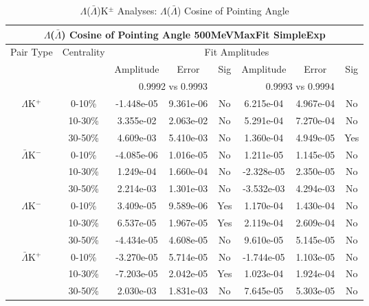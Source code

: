 \documentclass[../AnalysisNoteJBuxton.tex]{subfiles}
\begin{document}
\begin{table}
 \centering
 \begin{tabular}{|c|c|c|c|c||c|c|c|}
  \multicolumn{8}{c}{$\Lambda$($\bar{\Lambda}$) Cosine of Pointing Angle 500MeVMaxFit SimpleExp} \\
  \hline
  \multirow{3}{*}{Pair Type} & \multirow{3}{*}{Centrality} & \multicolumn{6}{c|}{Fit Amplitudes} \\
  \cline{3-8}
   & & Amplitude & Error & Sig & Amplitude & Error & Sig \\  
  \cline{3-8}
   & & \multicolumn{3}{c||}{0.9992 vs 0.9993} & \multicolumn{3}{c|}{0.9993 vs 0.9994} \\  
  \hline
  \multirow{3}{*}{$\Lambda$K$^{+}$}
   &  0-10\% & -1.448e-05 & 9.361e-06 & No & 6.215e-04 & 4.967e-04 & No \\
   & 10-30\% & 3.355e-02 & 2.063e-02 & No & 5.291e-04 & 7.270e-04 & No \\
   & 30-50\% & 4.609e-03 & 5.410e-03 & No & 1.360e-04 & 4.949e-05 & Yes \\
  \hline
  \multirow{3}{*}{$\bar{\Lambda}$K$^{-}$}
   &  0-10\% & -4.085e-06 & 1.016e-05 & No & 1.211e-05 & 1.145e-05 & No \\
   & 10-30\% & 1.249e-04 & 1.660e-04 & No & -2.328e-05 & 2.350e-05 & No \\
   & 30-50\% & 2.214e-03 & 1.301e-03 & No & -3.532e-03 & 4.294e-03 & No \\
  \hline \hline
  \multirow{3}{*}{$\Lambda$K$^{-}$}
   &  0-10\% & 3.409e-05 & 9.589e-06 & Yes & 1.170e-04 & 1.430e-04 & No \\
   & 10-30\% & 6.537e-05 & 1.967e-05 & Yes & 2.119e-04 & 2.609e-04 & No \\
   & 30-50\% & -4.434e-05 & 4.608e-05 & No & 9.610e-05 & 5.145e-05 & No \\
  \hline
  \multirow{3}{*}{$\bar{\Lambda}$K$^{+}$}
   &  0-10\% & -3.270e-05 & 5.714e-05 & No & -1.744e-05 & 1.103e-05 & No \\
   & 10-30\% & -7.203e-05 & 2.042e-05 & Yes & 1.023e-04 & 1.924e-04 & No \\
   & 30-50\% & 2.030e-03 & 1.831e-03 & No & 7.645e-05 & 5.303e-05 & No \\
  \hline
 \end{tabular}
 \caption{$\Lambda$($\bar{\Lambda}$)K$^{\pm}$ Analyses: $\Lambda$($\bar{\Lambda}$) Cosine of Pointing Angle}
 \label{tab:LamCosPointingAngleLamKch_500MeVMaxFit_SimpleExp}
\end{table}
\end{document}
